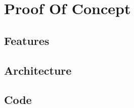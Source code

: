 
%

\chapter{Proof Of Concept}
\label{cha:proof_of_concept}

\section{Features}

\section{Architecture}

\section{Code}